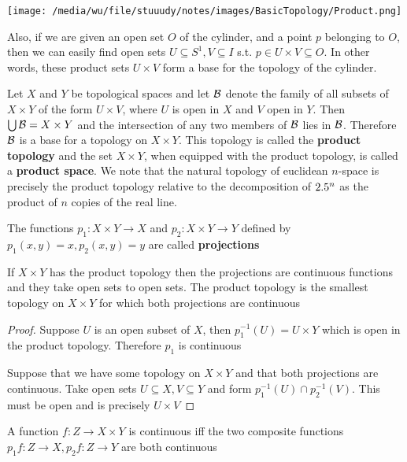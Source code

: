 \documentclass[11pt]{article}
\begin{document}
\begin{center}
\texttt{[image: /media/wu/file/stuuudy/notes/images/BasicTopology/Product.png]}
\end{center}

Also, if we are given an open set \(O\) of the cylinder, and a point \(p\)
belonging to \(O\), then we can easily find open sets \(U\subseteq
   S^1,V\subseteq I\) s.t. \(p\in U\times V\subseteq O\).
In other words, these product sets \(U\times V\) form a base for the topology
of the cylinder.

Let \(X\) and \(Y\) be topological spaces and let \(\mathcal{B}\) denote the family
of all subsets of \(X\times Y\) of the form \(U\times V\), where \(U\) is
open in \(X\) and \(V\) open in \(Y\). Then \(\bigcup\mathcal{B}=X\times Y\) and
the intersection of any two members of \(\mathcal{B}\) lies in \(\mathcal{B}\). Therefore
\(\mathcal{B}\) is a base for a topology on \(X\times Y\). This topology is called
the \textbf{product topology} and the set \(X\times Y\), when equipped with the
product topology, is called a \textbf{product space}. We note that the natural
topology of euclidean \(n\)-space is precisely the product topology relative
to the decomposition of \(2.5^n\) as the product of \(n\) copies of the real
line.

The functions \(p_1:X\times Y\to X\) and \(p_2:X\times Y\to Y\) defined by
\(p_1(x,y)=x,p_2(x,y)=y\) are called \textbf{projections}

\begin{theorem}[]
If \(X\times Y\) has the product topology then the projections are continuous
functions and they take open sets to open sets. The product topology is the
smallest topology on \(X\times Y\) for which both projections are continuous
\end{theorem}

\begin{proof}
Suppose \(U\) is an open subset of \(X\), then \(p_1^{-1}(U)=U\times Y\)
which is open in the product topology. Therefore \(p_1\) is continuous

Suppose that we have some topology on \(X\times Y\) and that both projections
are continuous. Take open sets \(U\subseteq X,V\subseteq Y\) and form
\(p_1^{-1}(U)\cap p_2^{-1}(V)\). This must be open and is precisely \(U\times
   V\)
\end{proof}

\begin{theorem}[]
A function \(f:Z\to X\times Y\) is continuous iff the two composite functions
\(p_1f:Z\to X,p_2f:Z\to Y\) are both continuous
\end{theorem}
\end{document}

